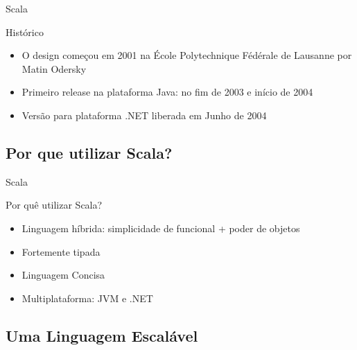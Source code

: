 \begin{frame}{Scala}
    \begin{block}{Histórico}
        \begin{itemize}
            \item O design começou em 2001 na École Polytechnique Fédérale de Lausanne por Matin Odersky
            \item Primeiro release na plataforma Java: no fim de 2003 e início de 2004 
            \item Versão para plataforma .NET liberada em Junho de 2004
        \end{itemize}
    \end{block}
\end{frame}
\subsection{Por que utilizar Scala?}

\begin{frame}{Scala}
    \begin{block}{Por quê utilizar Scala?}
        \begin{itemize}
            \item Linguagem híbrida: simplicidade de funcional + poder de objetos
            \item Fortemente tipada
            \item Linguagem Concisa
            \item Multiplataforma: JVM e .NET 
        \end{itemize}
    \end{block}
\end{frame} 

\subsection{Uma Linguagem Escalável}
